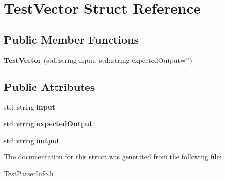 \hypertarget{structTestVector}{}\section{Test\+Vector Struct Reference}
\label{structTestVector}
\subsection*{Public Member Functions}
\begin{DoxyCompactItemize}
\item 
{\bfseries Test\+Vector} (std\+::string input, std\+::string expected\+Output=\char`\"{}\char`\"{})\hypertarget{structTestVector_a060e66ed253d04a71d65a4257f74eb2d}{}\label{structTestVector_a060e66ed253d04a71d65a4257f74eb2d}

\end{DoxyCompactItemize}
\subsection*{Public Attributes}
\begin{DoxyCompactItemize}
\item 
std\+::string {\bfseries input}\hypertarget{structTestVector_ace4526fda14e70cfe0cff2459cdb0cbc}{}\label{structTestVector_ace4526fda14e70cfe0cff2459cdb0cbc}

\item 
std\+::string {\bfseries expected\+Output}\hypertarget{structTestVector_a28f486ddc9f19a60408f4ac34c482011}{}\label{structTestVector_a28f486ddc9f19a60408f4ac34c482011}

\item 
std\+::string {\bfseries output}\hypertarget{structTestVector_aabadde25dd47628deb43051d0db31324}{}\label{structTestVector_aabadde25dd47628deb43051d0db31324}

\end{DoxyCompactItemize}


The documentation for this struct was generated from the following file\+:\begin{DoxyCompactItemize}
\item 
Test\+Parser\+Info.\+h\end{DoxyCompactItemize}
